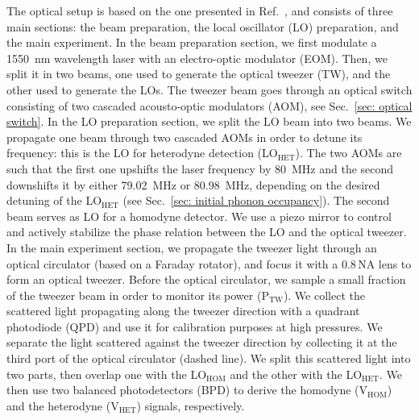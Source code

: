 \documentclass[aps, 
reprint, 
notitlepage,  superscriptaddress, 
onecolumn]{revtex4-1}
\newcommand{\<}{\langle}
\renewcommand{\>}{\rangle}
\begin{document}
The optical setup is based on the one presented in Ref.~\cite{tebbenjohanns_quantum_2021}, and consists of three main sections: the beam preparation, the local oscillator (LO) preparation, and the main experiment. 
%
In the beam preparation section, we first modulate a \SI{1550}{nm} wavelength laser with an electro-optic modulator (EOM).
Then, we split it in two beams, one used to generate the optical tweezer (TW), and the other used to generate the LOs. 
%
The tweezer beam goes through an optical switch consisting of two cascaded acousto-optic modulators (AOM), see Sec.~\ref{sec: optical switch}. 
%
In the LO preparation section, we split the LO beam into two beams. We propagate one beam through two cascaded AOMs in order to detune its frequency: this is the LO for heterodyne detection (LO$_\mathrm{HET}$). The two AOMs are such that the first one upshifts the laser frequency by \SI{80}{MHz} and the second downshifts it by either \SI{79.02}{MHz} or \SI{80.98}{MHz}, depending on the desired detuning of the LO$_\mathrm{HET}$ (see Sec.~\ref{sec: initial phonon occupancy}).
%
The second beam serves as LO for a homodyne detector. We use a piezo mirror to control and actively stabilize the phase relation between the LO and the optical tweezer.
%
In the main experiment section, we propagate the tweezer light through an optical circulator (based on a Faraday rotator), and focus it with a 0.8\,NA lens to form an optical tweezer. 
%
Before the optical circulator, we sample a small fraction of the tweezer beam in order to monitor its power (P$_\mathrm{TW}$). 
%
We collect the scattered light propagating along the tweezer direction with a quadrant photodiode (QPD) and use it for calibration purposes at high pressures. 
%
We separate the light scattered against the tweezer direction by collecting it at the third port of the optical circulator (dashed line). 
%
We split this scattered light into two parts, then overlap one with the LO$_\mathrm{HOM}$ and the other with the LO$_\mathrm{HET}$. 
%
We then use two balanced photodetectors (BPD) to derive the homodyne (V$_\mathrm{HOM}$) and the heterodyne (V$_\mathrm{HET}$) signals, respectively. 
%
\end{document}
